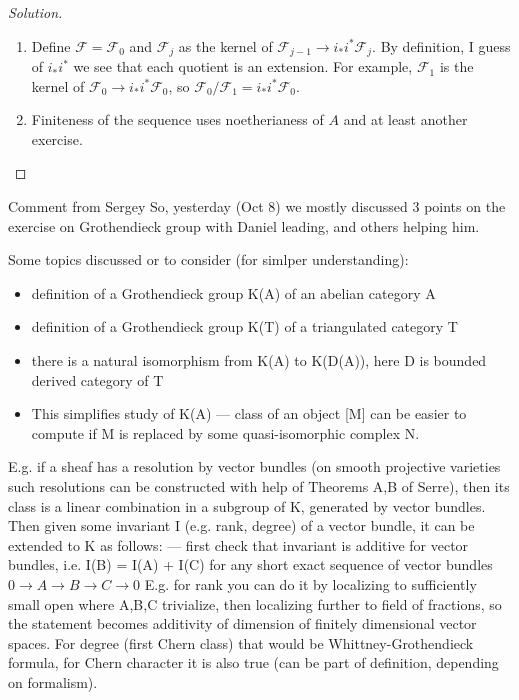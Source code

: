 \begin{proof}[Solution]
\begin{enumerate}[label=\alph*.]
\begin{enumerate}[label=\textbf{Step \arabic*}]
						\item Define $\mathcal{F}=\mathcal{F}_0$ and $\mathcal{F}_j$ as the kernel of $\mathcal{F}_{j-1}\longrightarrow i_* i^*\mathcal{F}_j$. By definition, I guess of $i_*i^*$ we see that each quotient is an extension. For example,  $\mathcal{F}_1$ is the kernel of $\mathcal{F}_0\longrightarrow i_* i^*\mathcal{F}_0$, so  $\mathcal{F}_0/\mathcal{F}_1=i_* i^*\mathcal{F}_0$.

						\item Finiteness of the sequence uses noetherianess of $A$ and at least another exercise.
				\end{enumerate}
	\end{enumerate}
\end{proof}

\begin{thing4}{Comment from Sergey}\leavevmode
	So, yesterday (Oct 8) we mostly discussed 3 points on the exercise on Grothendieck group with Daniel leading, and others helping him.

Some topics discussed or to consider (for simlper understanding):

\begin{itemize}
\item definition of a Grothendieck group K(A) of an abelian category A
\item definition of a Grothendieck group K(T) of a triangulated category T
\item  there is a natural isomorphism from K(A) to K(D(A)), here D is bounded derived category of T
 \item This simplifies study of K(A) — class of an object [M] can be easier to compute if M is replaced by some quasi-isomorphic complex N.
\end{itemize}

E.g. if a sheaf has a resolution by vector bundles (on smooth projective varieties such resolutions can be constructed with help of Theorems A,B of Serre), then its class is a linear combination in a subgroup of K, generated by vector bundles. {\color{3}Then given some invariant I (e.g. rank, degree) of a vector bundle, it can be extended to K as follows}:
 — first check that invariant is additive for vector bundles, i.e.
      I(B) = I(A) + I(C) for any short exact sequence of vector bundles $0 \to A\to B\to C\to 0$
E.g. for rank you can do it by localizing to sufficiently small open where A,B,C trivialize, then localizing further to field of fractions, so the statement becomes additivity of dimension of finitely dimensional vector spaces.
For degree (first Chern class) that would be Whittney-Grothendieck formula, for Chern character it is also true (can be part of definition, depending on formalism).


\end{thing4}
